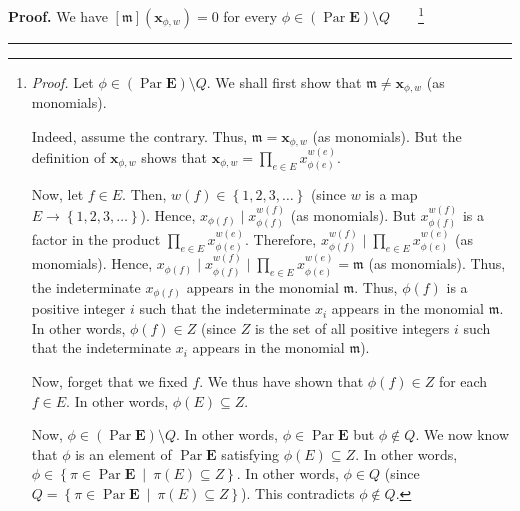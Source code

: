 \documentclass[numbers=enddot,12pt,final,onecolumn,notitlepage,abstracton]{scrartcl}
\theoremstyle{definition}
\newenvironment{proof}[1][Proof]{\noindent\textbf{#1.} }{\ \rule{0.5em}{0.5em}}
\let\prodnonlimits\prod
\renewcommand{\prod}{\prodnonlimits\limits}
\newenvironment{verlong}{}{}
\begin{document}
\begin{verlong}
\begin{footnotesize}
\begin{proof}
We have $\left[  \mathfrak{m}\right]  \left(  {\mathbf{x}}_{\phi,w}\right)
=0$ for every $\phi\in\left(  \operatorname*{Par}\mathbf{E}\right)  \setminus
Q$\ \ \ \ \footnote{\textit{Proof.} Let $\phi\in\left(  \operatorname*{Par}%
\mathbf{E}\right)  \setminus Q$. We shall first show that $\mathfrak{m}%
\neq{\mathbf{x}}_{\phi,w}$ (as monomials).
\par
Indeed, assume the contrary. Thus, $\mathfrak{m}={\mathbf{x}}_{\phi,w}$ (as
monomials). But the definition of $\mathbf{x}_{\phi,w}$ shows that
$\mathbf{x}_{\phi,w}=\prod_{e\in E}x_{\phi\left(  e\right)  }^{w\left(
e\right)  }$.
\par
Now, let $f\in E$. Then, $w\left(  f\right)  \in\left\{  1,2,3,\ldots\right\}
$ (since $w$ is a map $E\rightarrow\left\{  1,2,3,\ldots\right\}  $). Hence,
$x_{\phi\left(  f\right)  }\mid x_{\phi\left(  f\right)  }^{w\left(  f\right)
}$ (as monomials). But $x_{\phi\left(  f\right)  }^{w\left(  f\right)  }$ is a
factor in the product $\prod_{e\in E}x_{\phi\left(  e\right)  }^{w\left(
e\right)  }$. Therefore, $x_{\phi\left(  f\right)  }^{w\left(  f\right)  }%
\mid\prod_{e\in E}x_{\phi\left(  e\right)  }^{w\left(  e\right)  }$ (as
monomials). Hence, $x_{\phi\left(  f\right)  }\mid x_{\phi\left(  f\right)
}^{w\left(  f\right)  }\mid\prod_{e\in E}x_{\phi\left(  e\right)  }^{w\left(
e\right)  }=\mathfrak{m}$ (as monomials). Thus, the indeterminate
$x_{\phi\left(  f\right)  }$ appears in the monomial $\mathfrak{m}$. Thus,
$\phi\left(  f\right)  $ is a positive integer $i$ such that the indeterminate
$x_{i}$ appears in the monomial $\mathfrak{m}$. In other words, $\phi\left(
f\right)  \in Z$ (since $Z$ is the set of all positive integers $i$ such that
the indeterminate $x_{i}$ appears in the monomial $\mathfrak{m}$).
\par
Now, forget that we fixed $f$. We thus have shown that $\phi\left(  f\right)
\in Z$ for each $f\in E$. In other words, $\phi\left(  E\right)  \subseteq Z$.
\par
Now, $\phi\in\left(  \operatorname*{Par}\mathbf{E}\right)  \setminus Q$. In
other words, $\phi\in\operatorname*{Par}\mathbf{E}$ but $\phi\notin Q$. We now
know that $\phi$ is an element of $\operatorname*{Par}\mathbf{E}$ satisfying
$\phi\left(  E\right)  \subseteq Z$. In other words, $\phi\in\left\{  \pi
\in\operatorname*{Par}\mathbf{E}\ \mid\ \pi\left(  E\right)  \subseteq
Z\right\}  $. In other words, $\phi\in Q$ (since $Q=\left\{  \pi
\in\operatorname*{Par}\mathbf{E}\ \mid\ \pi\left(  E\right)  \subseteq
Z\right\}  $). This contradicts $\phi\notin Q$.
\par
}
\end{proof}
\end{footnotesize}
\end{verlong}
\end{document}
